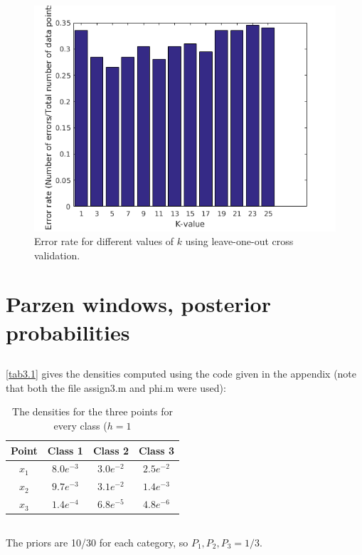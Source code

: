 \documentclass[10pt]{article}
\begin{document}
\begin{figure}[H]
 \centering
 \includegraphics[width=.7\textwidth]{assign2_4_b.png}
 \caption{Error rate for different values of $k$ using leave-one-out cross validation.}
 \label{fig2.4_b}
\end{figure}

\section{Parzen windows, posterior probabilities}
\subsection{}
\autoref{tab3.1} gives the densities computed using the code given in the appendix (note that both the file assign3.m and phi.m were used):

\begin{table}[H]
 \centering
 \caption{The densities for the three points for every class ($h=1$}
 \begin{tabular}{c|c|c|c}
  Point & Class 1 & Class 2 & Class 3 \\
  \hline
  $x_1$ & $8.0e^{-3}$ & $3.0e^{-2}$ & $2.5e^{-2}$ \\
  $x_2$ & $9.7e^{-3}$ & $3.1e^{-2}$ & $1.4e^{-3}$ \\
  $x_3$ & $1.4e^{-4}$ & $6.8e^{-5}$ & $4.8e^{-6}$ \\
 \end{tabular}
 \label{tab3.1}
\end{table}

\subsection{}
The priors are 10/30 for each category, so ${P_1, P_2, P_3} = 1/3$.
\end{document}
